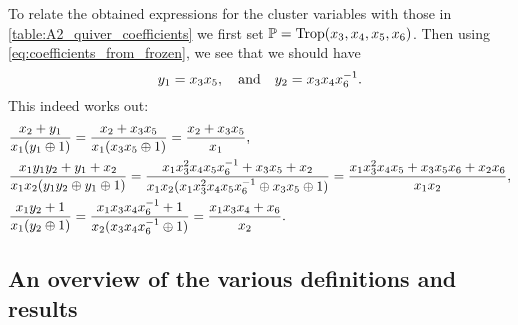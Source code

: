 \begin{example}
	To relate the obtained expressions for the cluster variables with those in
	\cref{table:A2_quiver_coefficients} we first set $\mathbb{P} = \operatorname{Trop}(x_3, x_4, x_5, x_6)$.
	Then using \cref{eq:coefficients_from_frozen}, we see that we should have
	\begin{equation*}
		y_1 = x_3x_5, \quad \text{and} \quad y_2 = x_3x_4x_6^{-1}.
	\end{equation*}
	This indeed works out:
	\begin{align*}
		 & \frac{x_2 + y_1}{x_1(y_1 \oplus 1)} = \frac{x_2 + x_3 x_5}{x_1(x_3x_5\oplus 1)} = \frac{x_2 + x_3 x_5}{x_1},                                                                                                                       \\
		 & \frac{x_1y_1y_2 + y_1 + x_2}{x_1x_2(y_1y_2 \oplus y_1 \oplus 1)} = \frac{x_1x_3^2x_4x_5x_6^{-1} + x_3x_5 + x_2}{x_1x_2(x_1x_3^2x_4x_5x_6^{-1} \oplus x_3 x_5 \oplus 1)} = \frac{x_1 x_3^2 x_4 x_5 + x_3 x_5 x_6 + x_2 x_6}{x_1 x_2}, \\
		 & \frac{x_1 y_2 + 1}{x_1 (y_2 \oplus 1)} = \frac{x_1 x_3 x_4 x_6^{-1} + 1}{x_2 (x_3 x_4 x_6^{-1} \oplus 1)} = \frac{x_1 x_3 x_4 + x_6}{x_2}.
	\end{align*}
\end{example}

\subsection{An overview of the various definitions and results}

